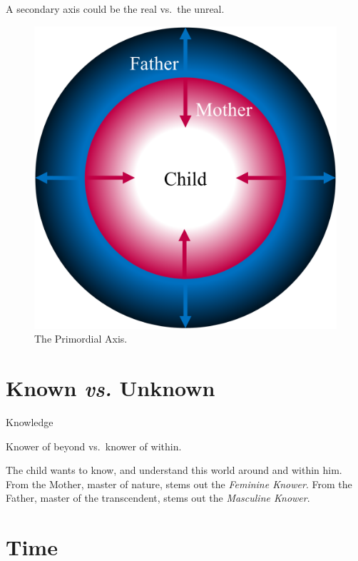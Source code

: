 \documentclass[
]{book}
\begin{document}
A secondary axis could be the real vs.~the unreal.

\begin{figure}

{\centering \includegraphics[width=\textwidth]{img/protection} 

}

\caption{The Primordial Axis.}\label{fig:unnamed-chunk-14}
\end{figure}

\hypertarget{known-vs.-unknown}{%
\section{\texorpdfstring{Known \emph{vs.} Unknown}{Known vs. Unknown}}\label{known-vs.-unknown}}

Knowledge

Knower of beyond vs.~knower of within.

The child wants to know, and understand this world around and within him. From the Mother, master of nature, stems out the \emph{Feminine Knower}. From the Father, master of the transcendent, stems out the \emph{Masculine Knower}.

\hypertarget{time}{%
\section{Time}\label{time}}
\end{document}
